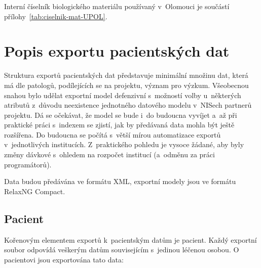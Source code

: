 \documentclass[11pt,draft,oneside]{fithesis2}
\begin{document}
Interní číselník biologického materiálu používaný v~Olomouci je součástí přílohy~\ref{tab:ciselnik-mat-UPOL}.


\section{Popis exportu pacientských dat}
Struktura exportů pacientských dat představuje minimální množinu dat, která má dle patologů, podílejících se na projektu, význam pro výzkum. Všeobecnou snahou bylo udělat exportní model defenzivní s~možností volby u~některých atributů z~důvodu neexistence jednotného datového modelu v~NISech partnerů projektu. Dá se očekávat, že model se bude i~do budoucna vyvíjet a~až při praktické práci s~indexem se zjistí, jak by předávaná data mohla být ještě rozšířena. 
Do budoucna se počítá s~větší mírou automatizace exportů v~jednotlivých institucích.
Z~praktického pohledu je vysoce žádané, aby byly změny dávkové s~ohledem na rozpočet institucí (a~odměnu za práci programátorů).

Data budou předávána ve formátu XML, exportní modely jsou ve formátu RelaxNG Compact.

\subsection{Pacient}
Kořenovým elementem exportů k~pacientským datům je pacient. Každý exportní soubor odpovídá veškerým datům souvisejícím s~jedinou léčenou osobou. O pacientovi jsou exportována tato data: 
\end{document}
